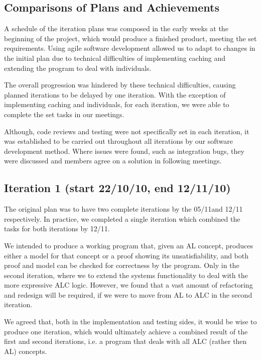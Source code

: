 \subsection{Comparisons of Plans and Achievements}

A schedule of the iteration plans was composed in the early weeks at the beginning of the project, which would produce a finished product, meeting the set requirements. Using agile software development allowed us to adapt to changes in the initial plan due to technical difficulties of implementing caching and extending the program to deal with individuals.

The overall progression was hindered by these technical difficulties, causing planned iterations to be delayed by one iteration. With the exception of implementing caching and individuals, for each iteration, we were able to complete the set tasks in our meetings.

Although, code reviews and testing were not specifically set in each iteration, it was established to be carried out throughout all iterations by our software development method. Where issues were found, such as integration bugs, they were discussed and members agree on a solution in following meetings.

\subsection*{Iteration 1 (start 22/10/10, end 12/11/10)}

The original plan was to have two complete iterations by the 05/11and 12/11 respectively. In practice, we completed a single iteration which combined the tasks for both iterations by 12/11.

We intended to produce a working program that, given an AL concept, produces either a model for that concept or a proof showing its unsatisfiability, and both proof and model can be checked for correctness by the program. Only in the second iteration, where we to extend the systems functionality to deal with the more expressive ALC logic. However, we found that a vast amount of refactoring and redesign will be required, if we were to move from AL to ALC in the second iteration.

We agreed that, both in the implementation and testing sides, it would be wise to produce one iteration, which would ultimately achieve a combined result of the first and second iterations, i.e. a program that deals with all ALC (rather then AL) concepts.

